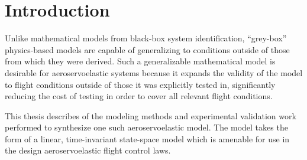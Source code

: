 \chapter{Introduction}
\label{ch:introduction}

%
%
%
%
%
%

Unlike mathematical models from black-box system identification, ``grey-box'' physics-based models are capable of generalizing to conditions outside of those from which they were derived. Such a generalizable mathematical model is desirable for aeroservoelastic systems because it expands the validity of the model to flight conditions outside of those it was explicitly tested in, significantly reducing the cost of testing in order to cover all relevant flight conditions.


This thesis describes of the modeling methods and experimental validation work performed to synthesize one such aeroservoelastic model. The model takes the form of a linear, time-invariant state-space model which is amenable for use in the design aeroservoelastic flight control laws.

%
%


